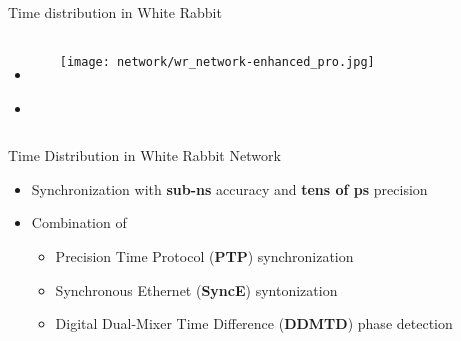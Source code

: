 \documentclass[compress,red]{beamer}
\begin{document}
\subsection{}
\begin{frame}{Time distribution in White Rabbit}


\begin{columns}[c]
 
  \begin{itemize}
    \item \textbf{\color{blue!90}{High accuracy/precision synchronization}}
    \item \color{gray}{Deterministic, reliable and low-latency Control Data delivery}
  \end{itemize}

    \begin{center}
   \texttt{[image: network/wr\_network-enhanced\_pro.jpg]}
    \end{center}
\end{columns}

\end{frame}
\begin{frame}{Time Distribution in White Rabbit Network}

  \begin{itemize}
    \item Synchronization with {\bf sub-ns} accuracy and {\bf tens of  ps} precision
    \item Combination of
	\begin{itemize}
	  \item Precision Time Protocol ({\bf PTP}) synchronization
	  \item Synchronous Ethernet ({\bf SyncE}) syntonization
	  \item Digital Dual-Mixer Time Difference ({\bf DDMTD}) phase detection
	\end{itemize}
  \end{itemize}
\end{frame}
\end{document}
